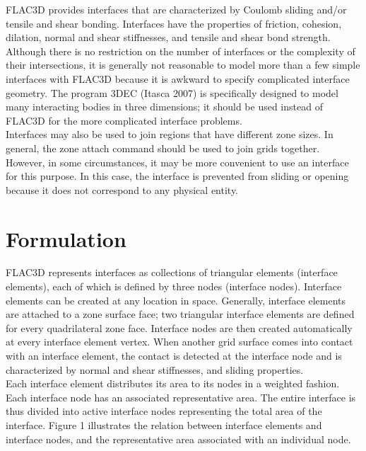 \documentclass[a4paper, nobind]{templates/ociamthesis}
\begin{document}
FLAC3D provides interfaces that are characterized by Coulomb sliding
and/or tensile and shear bonding. Interfaces have the properties of
friction, cohesion, dilation, normal and shear stiffnesses, and tensile
and shear bond strength. Although there is no restriction on the number
of interfaces or the complexity of their intersections, it is generally
not reasonable to model more than a few simple interfaces with FLAC3D
because it is awkward to specify complicated interface geometry. The
program 3DEC (Itasca 2007) is specifically designed to model many
interacting bodies in three dimensions; it should be used instead of
FLAC3D for the more complicated interface problems.\\

Interfaces may also be used to join regions that have different zone
sizes. In general, the zone attach command should be used to join grids
together. However, in some circumstances, it may be more convenient to
use an interface for this purpose. In this case, the interface is
prevented from sliding or opening because it does not correspond to any
physical entity.

\hypertarget{formulation}{%
\section{Formulation}\label{formulation}}

FLAC3D represents interfaces as collections of triangular elements
(interface elements), each of which is defined by three nodes (interface
nodes). Interface elements can be created at any location in space.
Generally, interface elements are attached to a zone surface face; two
triangular interface elements are defined for every quadrilateral zone
face. Interface nodes are then created automatically at every interface
element vertex. When another grid surface comes into contact with an
interface element, the contact is detected at the interface node and is
characterized by normal and shear stiffnesses, and sliding properties.\\

Each interface element distributes its area to its nodes in a weighted
fashion. Each interface node has an associated representative area. The
entire interface is thus divided into active interface nodes
representing the total area of the interface. Figure 1 illustrates the
relation between interface elements and interface nodes, and the
representative area associated with an individual node.
\end{document}
